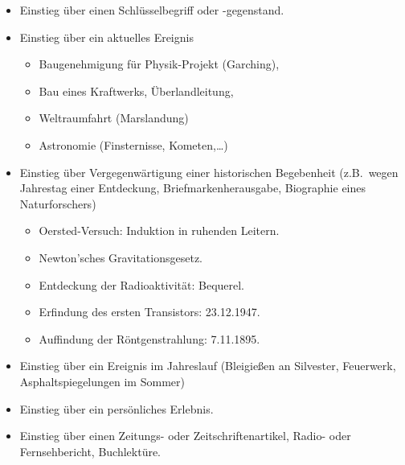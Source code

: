 \begin{itemize}
	
	\item
	Einstieg \"{u}ber einen Schl\"{u}sselbegriff oder -gegenstand.
	
	\item
	Einstieg \"{u}ber ein aktuelles Ereignis
	\begin{beisp}
			\begin{itemize}
	\item
	Baugenehmigung f\"{u}r Physik-Projekt (Garching),
	\item
	Bau eines Kraftwerks, \"{U}berlandleitung,
	\item
	Weltraumfahrt (Marslandung)
	\item
	Astronomie (Finsternisse, Kometen,\dots)
	\end{itemize}
	\end{beisp}

	
	\item
	Einstieg \"{u}ber Vergegenw\"{a}rtigung einer historischen Begebenheit
	(z.B.\ wegen Jahrestag einer Entdeckung, Briefmarkenherausgabe,
	Biographie eines Naturforschers)
	\begin{beisp}
			\begin{itemize}
	\item
	Oersted-Versuch: Induktion in ruhenden Leitern.
	\item
	Newton'sches Gravitationsgesetz.
	\item
	Entdeckung der Radioaktivit\"{a}t: Bequerel.
	\item
	Erfindung des ersten Transistors: 23.12.1947.
	\item
	Auffindung der R\"{o}ntgenstrahlung: 7.11.1895.
	\end{itemize}
	\end{beisp}
	

	
	\item
	Einstieg \"{u}ber ein Ereignis im Jahreslauf
	(Bleigie{\ss}en an Silvester, Feuerwerk, Asphaltspiegelungen im Sommer)
	
	\item
	Einstieg \"{u}ber ein pers\"{o}nliches Erlebnis.
	
	\item
	Einstieg \"{u}ber einen Zeitungs- oder Zeitschriftenartikel, Radio- oder Fernsehbericht, Buchlekt\"{u}re.

\end{itemize}

